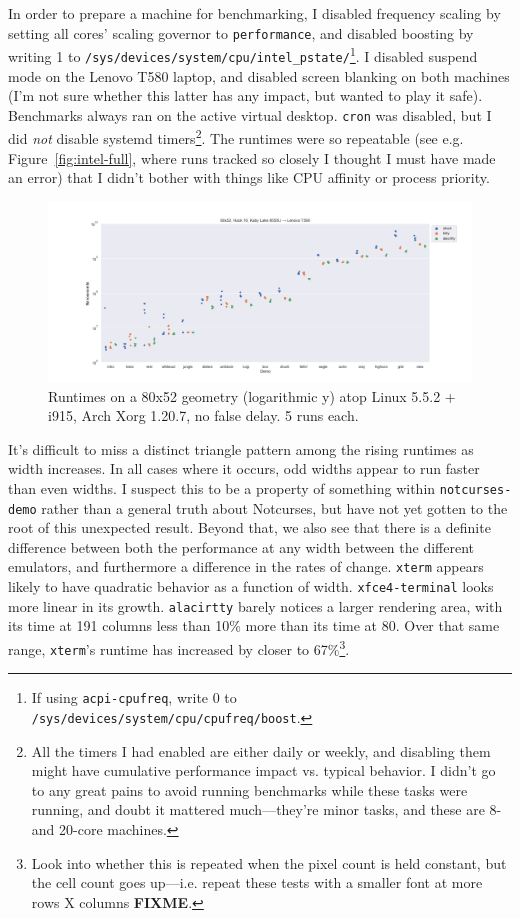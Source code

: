 In order to prepare a machine for benchmarking, I disabled frequency scaling
by setting all cores' scaling governor to \texttt{performance}, and disabled
boosting by writing 1 to \texttt{/sys/devices/system/cpu/intel\_pstate/}\footnote{If using \texttt{acpi-cpufreq}, write 0 to \texttt{/sys/devices/system/cpu/cpufreq/boost}.}.
I disabled suspend mode on the Lenovo T580 laptop, and disabled screen blanking
on both machines (I'm not sure whether this latter has any impact, but wanted
to play it safe). Benchmarks always ran on the active virtual desktop. \texttt{cron} was
disabled, but I did \textit{not} disable systemd timers\footnote{All the timers I
had enabled are either daily or weekly, and disabling them might have
cumulative performance impact vs. typical behavior. I didn't go to any great
pains to avoid running benchmarks while these tasks were running, and doubt it
mattered much---they're minor tasks, and these are 8- and 20-core machines.}.
The runtimes were so repeatable (see e.g. Figure~\ref{fig:intel-full}, where
runs tracked so closely I thought I must have made an error) that I didn't
bother with things like CPU affinity or process priority.

\begin{figure}[!htb]
\centering
\includegraphics[width=1\textwidth]{media/i915-80x52.png}
\caption[80x52 Intel i7-8550U benchmarks.]{Runtimes on a 80x52 geometry (logarithmic y) atop Linux 5.5.2 + i915, Arch Xorg 1.20.7, no false delay. 5 runs each.}
\label{fig:intel-secs}
\end{figure}

It's difficult to miss a distinct triangle pattern among the rising runtimes
as width increases. In all cases where it occurs, odd widths appear to run
faster than even widths. I suspect this to be a property of something within
\texttt{notcurses-demo} rather than a general truth about Notcurses, but have
not yet gotten to the root of this unexpected result. Beyond that, we also see
that there is a definite difference between both the performance at any width
between the different emulators, and furthermore a difference in the rates of
change. \texttt{xterm} appears likely to have quadratic behavior as a function
of width. \texttt{xfce4-terminal} looks more linear in its growth. \texttt{alacirtty}
barely notices a larger rendering area, with its time at 191 columns less than
10\% more than its time at 80. Over that same range, \texttt{xterm}'s runtime
has increased by closer to 67\%\footnote{Look into whether this is repeated when
the pixel count is held constant, but the cell count goes up---i.e. repeat these
tests with a smaller font at more rows X columns \textbf{FIXME}.}.


